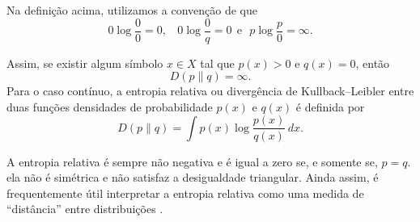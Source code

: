 Na definição acima, utilizamos a convenção de que
$$
0 \log \frac{0}{0} = 0, \ \ \ \ 0 \log \frac{0}{q} = 0 \ \  \text{e} \ \ \ p \log \frac{p}{0} = \infty.
$$
 
 
Assim, se existir algum símbolo $x \in  X $ tal que
$p(x) > 0$ e $q(x)=0$, então
\[
D(p\|q)=\infty.
\]
  Para o caso contínuo, a entropia
relativa ou divergência de Kullback--Leibler entre duas funções densidades de
probabilidade $p(x)$ e $q(x)$ é definida por
\begin{equation}
D(p\|q)
=
\int p(x)\log\frac{p(x)}{q(x)}\,dx.
\label{eq:kl_continua}
\end{equation}

A entropia relativa é sempre não negativa e é igual a zero se, e somente se,
$p=q$. ela  não é simétrica e não satisfaz a desigualdade triangular. Ainda assim,
é frequentemente útil interpretar a entropia relativa como uma medida de
``distância'' entre distribuições \cite{cover2006elements}.

